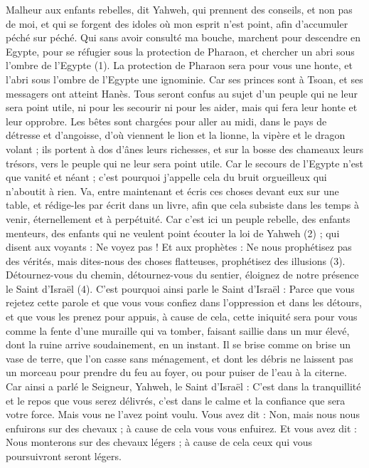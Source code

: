 \begin{multicols}{2}
\VerseOne{}Malheur aux enfants rebelles, dit Yahweh, qui prennent des conseils, et non pas de moi, et qui se forgent des idoles où mon esprit n'est point, afin d’accumuler péché sur péché.
Qui sans avoir consulté ma bouche, marchent pour descendre en Egypte, pour se réfugier sous la protection de Pharaon, et chercher un abri sous l'ombre de l'Egypte (1).
La protection de Pharaon sera pour vous une honte, et l’abri sous l'ombre de l'Egypte une ignominie.
Car ses princes sont à Tsoan, et ses messagers ont atteint Hanès.
Tous seront confus au sujet d’un peuple qui ne leur sera point utile, ni pour les secourir ni pour les aider, mais qui fera leur honte et leur opprobre.
Les bêtes sont chargées pour aller au midi, dans le pays de détresse et d’angoisse, d’où viennent le lion et la lionne, la vipère et le dragon volant ; ils portent à dos d’ânes leurs richesses, et sur la bosse des chameaux leurs trésors, vers le peuple qui ne leur sera point utile.
Car le secours de l’Egypte n’est que vanité et néant ; c'est pourquoi j’appelle cela du bruit orgueilleux qui n’aboutit à rien.
Va, entre maintenant et écris ces choses devant eux sur une table, et rédige-les par écrit dans un livre, afin que cela subsiste dans les temps à venir, éternellement et à perpétuité.
Car c'est ici un peuple rebelle, des enfants menteurs, des enfants qui ne veulent point écouter la loi de Yahweh (2) ;
qui disent aux voyants : Ne voyez pas ! Et aux prophètes : Ne nous prophétisez pas des vérités, mais dites-nous des choses flatteuses, prophétisez des illusions (3).
Détournez-vous du chemin, détournez-vous du sentier, éloignez de notre présence le Saint d'Israël (4).
C'est pourquoi ainsi parle le Saint d'Israël : Parce que vous rejetez cette parole et que vous vous confiez dans l'oppression et dans les détours, et que vous les prenez pour appuis,
à cause de cela, cette iniquité sera pour vous comme la fente d'une muraille qui va tomber, faisant saillie dans un mur élevé, dont la ruine arrive soudainement, en un instant.
Il se brise comme on brise un vase de terre, que l’on casse sans ménagement, et dont les débris ne laissent pas un morceau pour prendre du feu au foyer, ou pour puiser de l’eau à la citerne.
Car ainsi a parlé le Seigneur, Yahweh, le Saint d'Israël : C’est dans la tranquillité et le repos que vous serez délivrés, c’est dans le calme et la confiance que sera votre force. Mais vous ne l'avez point voulu.
Vous avez dit : Non, mais nous nous enfuirons sur des chevaux ; à cause de cela vous vous enfuirez. Et vous avez dit : Nous monterons sur des chevaux légers ; à cause de cela ceux qui vous poursuivront seront légers.

\end{multicols}
